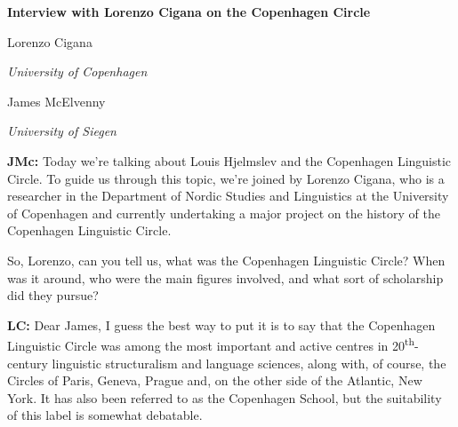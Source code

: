 
\begin{styleStandard}
\textbf{Interview with Lorenzo Cigana on the Copenhagen Circle}
\end{styleStandard}

\begin{styleStandard}
Lorenzo Cigana
\end{styleStandard}

\begin{styleStandard}
\textit{University of Copenhagen}
\end{styleStandard}

\begin{styleStandard}
James McElvenny
\end{styleStandard}

\begin{styleStandard}
\textit{University of Siegen}
\end{styleStandard}

\begin{styleStandard}
\textbf{JMc:} Today we’re talking about Louis Hjelmslev and the Copenhagen Linguistic Circle. To guide us through this topic, we’re joined by Lorenzo Cigana, who is a researcher in the Department of Nordic Studies and Linguistics at the University of Copenhagen and currently undertaking a major project on the history of the Copenhagen Linguistic Circle.
\end{styleStandard}

\begin{styleStandard}
So, Lorenzo, can you tell us, what was the Copenhagen Linguistic Circle? When was it around, who were the main figures involved, and what sort of scholarship did they pursue?
\end{styleStandard}

\begin{styleStandard}
\textbf{LC:} Dear James, I guess the best way to put it is to say that the Copenhagen Linguistic Circle was among the most important and active centres in 20\textsuperscript{th}{}-century linguistic structuralism and language sciences, along with, of course, the Circles of Paris, Geneva, Prague and, on the other side of the Atlantic, New York. It has also been referred to as the Copenhagen School, but the suitability of this label is somewhat debatable.
\end{styleStandard}

